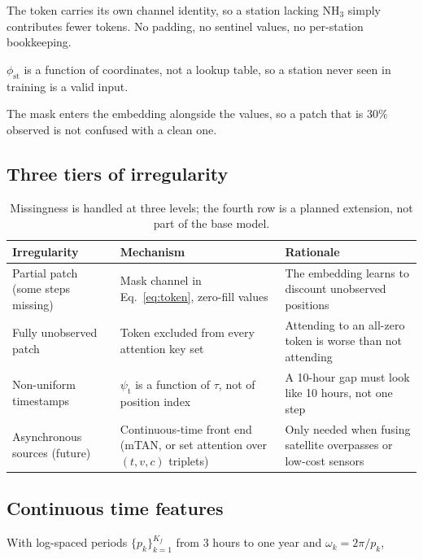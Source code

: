 \documentclass[11pt,a4paper]{article}
\begin{document}
\begin{description}[leftmargin=1.4em,style=nextline]
\item[Channel-count flexibility.] The token carries its own channel identity, so
a station lacking NH$_3$ simply contributes fewer tokens. No padding, no
sentinel values, no per-station bookkeeping.
\item[Station generalisation.] $\phi_{\text{st}}$ is a function of coordinates,
not a lookup table, so a station never seen in training is a valid input.
\item[Mask visibility.] The mask enters the embedding alongside the values, so a
patch that is $30\%$ observed is not confused with a clean one.
\end{description}

\subsection{Three tiers of irregularity}

\begin{table}[h]
\centering
\small
\begin{tabular}{@{}p{4.1cm}p{4.6cm}p{5.6cm}@{}}
\toprule
Irregularity & Mechanism & Rationale \\
\midrule
Partial patch (some steps missing) & Mask channel in Eq.~\eqref{eq:token}, zero-fill values & The embedding learns to discount unobserved positions \\
Fully unobserved patch & Token excluded from every attention key set & Attending to an all-zero token is worse than not attending \\
Non-uniform timestamps & $\psi_{\text{t}}$ is a function of $\tau$, not of position index & A 10-hour gap must look like 10 hours, not one step \\
Asynchronous sources (future) & Continuous-time front end (mTAN, or set attention over $(t,v,c)$ triplets) & Only needed when fusing satellite overpasses or low-cost sensors \\
\bottomrule
\end{tabular}
\caption{Missingness is handled at three levels; the fourth row is a planned
extension, not part of the base model.}
\end{table}

\subsection{Continuous time features}

With log-spaced periods $\{p_k\}_{k=1}^{K_f}$ from 3 hours to one year and
$\omega_k=2\pi/p_k$,
\end{document}
